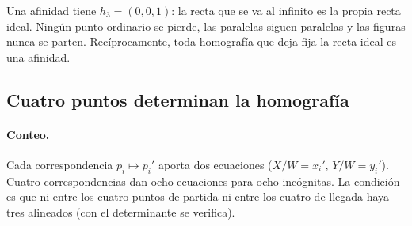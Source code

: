 \begin{atencion}
Una afinidad tiene \(h_3=(0,0,1)\): la recta que se va al infinito es la propia recta ideal.
Ningún punto ordinario se pierde, las paralelas siguen paralelas y las figuras nunca se
parten. Recíprocamente, toda homografía que deja fija la recta ideal es una afinidad.
\end{atencion}

\subsection{Cuatro puntos determinan la homografía}\label{sec:cuatro-puntos}

\paragraph{Conteo.} Cada correspondencia \(p_i\mapsto p_i'\) aporta dos ecuaciones
(\(X/W=x_i'\), \(Y/W=y_i'\)). Cuatro correspondencias dan ocho ecuaciones para ocho
incógnitas. La condición es que ni entre los cuatro puntos de partida ni entre los cuatro de
llegada haya tres alineados (con el determinante se verifica).

